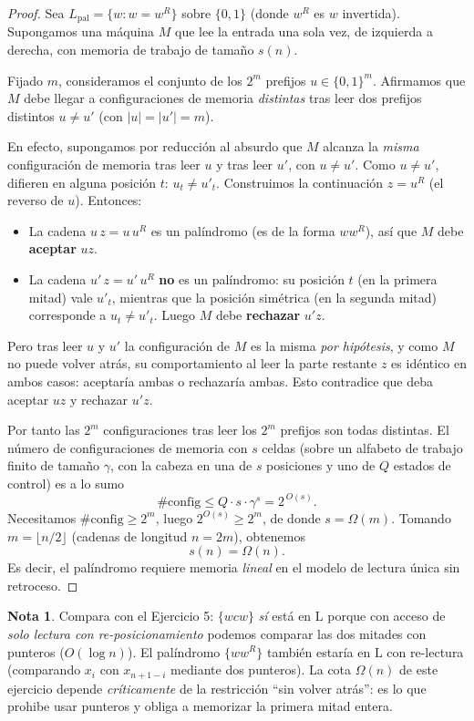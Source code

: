 \documentclass[11pt,a4paper]{article}
\theoremstyle{plain}
\theoremstyle{definition}
\newtheorem*{nota}{Nota}
\newcommand{\Lclass}{\mathrm{L}}
\begin{document}
\begin{proof}
Sea $L_{\text{pal}}=\{w : w=w^{R}\}$ sobre $\{0,1\}$ (donde $w^{R}$ es $w$ invertida).
Supongamos una m\'aquina $M$ que lee la entrada una sola vez, de izquierda a derecha,
con memoria de trabajo de tama\~no $s(n)$.

Fijado $m$, consideramos el conjunto de los $2^{m}$ prefijos $u\in\{0,1\}^{m}$.
Afirmamos que $M$ debe llegar a configuraciones de memoria \emph{distintas} tras leer
dos prefijos distintos $u\neq u'$ (con $|u|=|u'|=m$).

En efecto, supongamos por reducci\'on al absurdo que $M$ alcanza la \emph{misma}
configuraci\'on de memoria tras leer $u$ y tras leer $u'$, con $u\neq u'$. Como
$u\neq u'$, difieren en alguna posici\'on $t$: $u_t\neq u'_t$. Construimos la
continuaci\'on $z=u^{R}$ (el reverso de $u$). Entonces:
\begin{itemize}[nosep]
  \item La cadena $u\,z = u\,u^{R}$ es un pal\'indromo (es de la forma $w w^{R}$),
        as\'i que $M$ debe \textbf{aceptar} $u z$.
  \item La cadena $u'\,z = u'\,u^{R}$ \textbf{no} es un pal\'indromo: su posici\'on
        $t$ (en la primera mitad) vale $u'_t$, mientras que la posici\'on sim\'etrica
        (en la segunda mitad) corresponde a $u_t\neq u'_t$. Luego $M$ debe
        \textbf{rechazar} $u' z$.
\end{itemize}
Pero tras leer $u$ y $u'$ la configuraci\'on de $M$ es la misma \emph{por hip\'otesis},
y como $M$ no puede volver atr\'as, su comportamiento al leer la parte restante $z$ es
id\'entico en ambos casos: aceptar\'ia ambas o rechazar\'ia ambas. Esto contradice que
deba aceptar $uz$ y rechazar $u'z$.

Por tanto las $2^{m}$ configuraciones tras leer los $2^{m}$ prefijos son todas
distintas. El n\'umero de configuraciones de memoria con $s$ celdas (sobre un
alfabeto de trabajo finito de tama\~no $\gamma$, con la cabeza en una de $s$
posiciones y uno de $Q$ estados de control) es a lo sumo
\[
\#\text{config} \le Q\cdot s\cdot \gamma^{s} = 2^{\,O(s)} .
\]
Necesitamos $\#\text{config}\ge 2^{m}$, luego $2^{O(s)}\ge 2^{m}$, de donde
$s = \Omega(m)$. Tomando $m=\lfloor n/2\rfloor$ (cadenas de longitud $n=2m$),
obtenemos
\[
s(n) = \Omega(n).
\]
Es decir, el pal\'indromo requiere memoria \emph{lineal} en el modelo de lectura
\'unica sin retroceso.
\end{proof}

\begin{nota}
Compara con el Ejercicio 5: $\{wcw\}$ \emph{s\'i} est\'a en $\Lclass$ porque con
acceso de \emph{solo lectura con re-posicionamiento} podemos comparar las dos mitades
con punteros ($O(\log n)$). El pal\'indromo $\{ww^{R}\}$ tambi\'en estar\'ia en
$\Lclass$ con re-lectura (comparando $x_i$ con $x_{n+1-i}$ mediante dos punteros). La
cota $\Omega(n)$ de este ejercicio depende \emph{cr\'iticamente} de la restricci\'on
``sin volver atr\'as'': es lo que prohibe usar punteros y obliga a memorizar la
primera mitad entera.
\end{nota}
\end{document}
